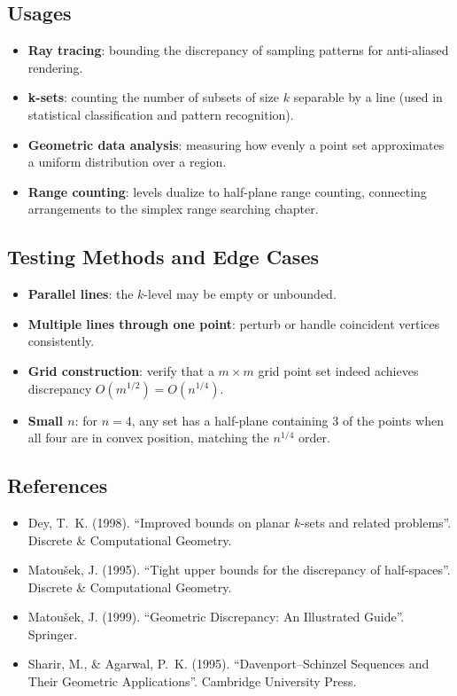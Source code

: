 \subsection{Usages}
\begin{itemize}
    \item \textbf{Ray tracing}: bounding the discrepancy of sampling patterns
      for anti-aliased rendering.
    \item \textbf{k-sets}: counting the number of subsets of size $k$ separable
      by a line (used in statistical classification and pattern recognition).
    \item \textbf{Geometric data analysis}: measuring how evenly a point set
      approximates a uniform distribution over a region.
    \item \textbf{Range counting}: levels dualize to half-plane range counting,
      connecting arrangements to the simplex range searching chapter.
\end{itemize}

\subsection{Testing Methods and Edge Cases}
\begin{itemize}
    \item \textbf{Parallel lines}: the $k$-level may be empty or unbounded.
    \item \textbf{Multiple lines through one point}: perturb or handle
      coincident vertices consistently.
    \item \textbf{Grid construction}: verify that a $m \times m$ grid point set
      indeed achieves discrepancy $O(m^{1/2}) = O(n^{1/4})$.
    \item \textbf{Small $n$}: for $n = 4$, any set has a half-plane containing
      $3$ of the points when all four are in convex position, matching the
      $n^{1/4}$ order.
\end{itemize}

\subsection{References}
\begin{itemize}
    \item Dey, T.~K. (1998). ``Improved bounds on planar $k$-sets and related
      problems''. Discrete \& Computational Geometry.
    \item Matou\v{s}ek, J. (1995). ``Tight upper bounds for the discrepancy of
      half-spaces''. Discrete \& Computational Geometry.
    \item Matou\v{s}ek, J. (1999). ``Geometric Discrepancy: An Illustrated
      Guide''. Springer.
    \item Sharir, M., \& Agarwal, P.~K. (1995). ``Davenport--Schinzel
      Sequences and Their Geometric Applications''. Cambridge University
      Press.
\end{itemize}

